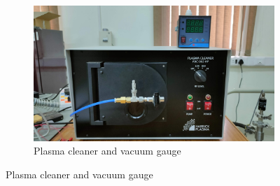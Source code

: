 \begin{figure}[H]
	\centering
	\begin{subfigure}[t]{0.7\textwidth}
		\centering
		\includegraphics[width=\textwidth]{figures/plcl.jpg}
		\caption{Plasma cleaner and vacuum gauge}
	\end{subfigure}
	

\end{figure}
